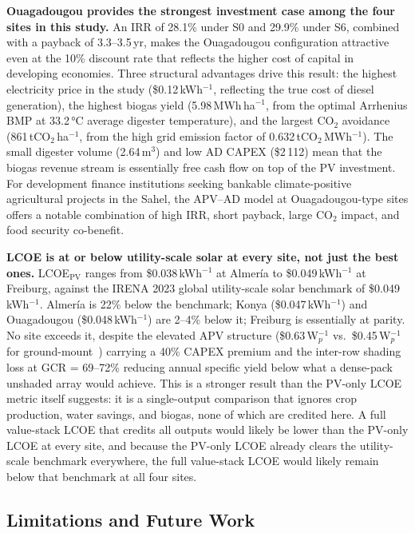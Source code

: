 \textbf{Ouagadougou provides the strongest investment case among the
	four sites in this study.}
An IRR of 28.1\% under S0 and 29.9\% under S6, combined with a
payback of 3.3--3.5\,yr, makes the Ouagadougou configuration
attractive even at the 10\% discount rate that reflects the higher
cost of capital in developing economies. Three structural advantages
drive this result: the highest electricity price in the study
(\$0.12\,kWh$^{-1}$, reflecting the true cost of diesel generation),
the highest biogas yield (5.98\,MWh\,ha$^{-1}$, from the optimal
Arrhenius BMP at 33.2\,\si{\celsius} average digester temperature),
and the largest CO$_2$ avoidance (861\,tCO$_2$\,ha$^{-1}$, from the
high grid emission factor of 0.632\,tCO$_2$\,MWh$^{-1}$). The small
digester volume (2.64\,m$^3$) and low AD CAPEX (\$2\,112) mean that
the biogas revenue stream is essentially free cash flow on top of
the PV investment. For development finance institutions seeking
bankable climate-positive agricultural projects in the Sahel,
the APV--AD model at Ouagadougou-type sites offers a notable
combination of high IRR, short payback, large CO$_2$ impact,
and food security co-benefit.

\textbf{LCOE is at or below utility-scale solar at every site, not
	just the best ones.} LCOE$_{\text{PV}}$ ranges from
\$0.038\,kWh$^{-1}$ at Almer\'{i}a to \$0.049\,kWh$^{-1}$ at
Freiburg, against the IRENA 2023 global utility-scale solar
benchmark of \$0.049\,kWh$^{-1}$. Almer\'{i}a is 22\% below the
benchmark; Konya (\$0.047\,kWh$^{-1}$) and Ouagadougou
(\$0.048\,kWh$^{-1}$) are 2--4\% below it; Freiburg is essentially
at parity. No site exceeds it, despite the elevated APV structure
(\$0.63\,W$_p^{-1}$ vs.\ \$0.45\,W$_p^{-1}$ for
ground-mount~\citep{irena2022}) carrying a 40\% CAPEX premium and
the inter-row shading loss at GCR = 69--72\% reducing annual
specific yield below what a dense-pack unshaded array would
achieve. This is a stronger result than the PV-only LCOE metric itself
suggests: it is a single-output comparison that ignores crop
production, water savings, and biogas, none of which are credited
here. A full value-stack LCOE that credits all outputs would likely
be lower than the PV-only LCOE at every site, and because the
PV-only LCOE already clears the utility-scale benchmark everywhere,
the full value-stack LCOE would likely remain below that benchmark
at all four sites.

\subsection{Limitations and Future Work}
\label{sec:discussion_limits}

